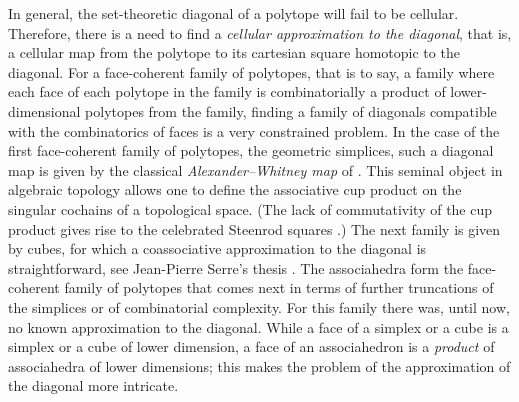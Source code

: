 \documentclass[11pt]{article}
\numberwithin{equation}{section}\providecommand{\No}{}
\theoremstyle{plain}
\theoremstyle{definition}
\begin{document}
In general, the set-theoretic diagonal of a polytope will fail to be cellular. Therefore, there is a need to find a \emph{cellular approximation to the diagonal}, that is, a cellular map from the polytope to its cartesian square homotopic to the diagonal. For a face-coherent family of polytopes, that is to say, a family where each face of each polytope in the family is combinatorially a product of lower-dimensional polytopes from the family, finding a family of diagonals compatible with the combinatorics of faces
is a very constrained problem.
In the case of the first face-coherent family of polytopes, the geometric simplices, such a diagonal map is given by the classical \emph{Alexander--Whitney map} of \cite{EilenbergZilber53, EilenbergMacLane54}. This seminal object in algebraic topology allows one to define the associative cup product on the singular cochains of a topological space.
(The lack of commutativity of the cup product gives rise to the celebrated Steenrod squares \cite{Steenrod47}.) The next family is given by cubes, for which a coassociative approximation to the diagonal is straightforward, see Jean-Pierre Serre's thesis \cite{Serre51}.
The associahedra form the face-coherent family of polytopes that comes next in terms of further truncations of the simplices or of combinatorial complexity.
For this family there was, until now, no known approximation to the diagonal.
While a face of a simplex or a cube is a simplex or a cube of lower dimension, a face of an associahedron is a \emph{product} of associahedra of lower dimensions; this makes the problem of the approximation of the diagonal more intricate.
\end{document}
